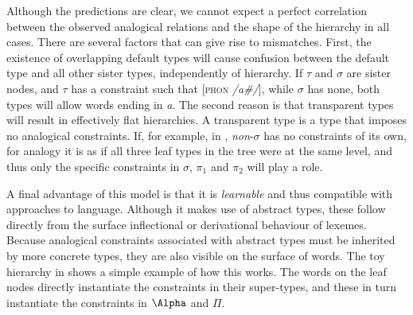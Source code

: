 Although the predictions are clear, we cannot expect a perfect correlation between the observed analogical relations and the shape of the hierarchy in all cases. There are several factors that can give rise to mismatches. First, the existence of overlapping default types will cause confusion between the default type and all other sister types, independently of hierarchy. If $\tau$ and $\sigma$ are sister nodes, and $\tau$ has a constraint such that [\textsc{phon} \textit{/a\#/}], while $\sigma$ has none, both types will allow words ending in \textit{a}. The second reason is that transparent types will result in effectively flat hierarchies. A transparent type is a type that imposes no analogical constraints. If, for example, in , \textit{non}-$\sigma$ has no constraints of its own, for analogy it is as if all three leaf types in the tree were at the same level, and thus only the specific constraints in $\sigma$, $\pi_1$ and $\pi_2$ will play a role.

A final advantage of this model is that it is \textit{learnable} and thus compatible with  approaches to language. Although it makes use of abstract types, these follow directly from the surface inflectional or derivational behaviour of lexemes. Because analogical constraints associated with abstract types must be inherited by more concrete types, they are also visible on the surface of words. The toy hierarchy in  shows a simple example of how this works. The words on the leaf nodes directly instantiate the constraints in their super-types, and these in turn instantiate the constraints in $\Alpha$ and $\Pi$.

